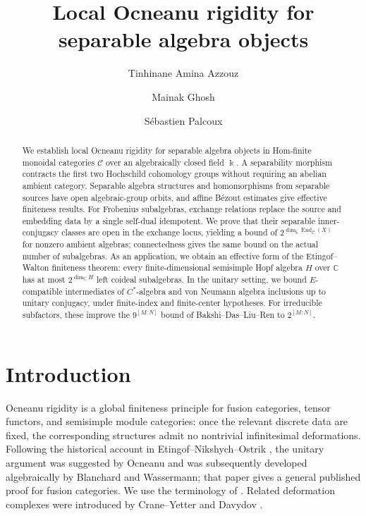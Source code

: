 \documentclass[11pt]{amsart}
\title[Local rigidity for separable algebra objects]
{Local Ocneanu rigidity for separable algebra objects}
\author{Tinhinane Amina Azzouz}
\author{Mainak Ghosh}
\author{S\'ebastien Palcoux}
\theoremstyle{definition}
\theoremstyle{remark}
\newcommand{\C}{\mathcal C}
\newcommand{\CC}{\mathbb C}
\newcommand{\kk}{\Bbbk}
\DeclareMathOperator{\End}{End}
\begin{document}
\begin{abstract}
We establish local Ocneanu rigidity for separable algebra objects in
Hom-finite monoidal categories $\C$ over an algebraically closed field $\kk$.
A separability morphism contracts the first two Hochschild cohomology
groups without requiring an abelian ambient category.  Separable algebra
structures and homomorphisms from separable sources have open algebraic-group
orbits, and affine B\'ezout estimates give effective finiteness results.
For Frobenius subalgebras, exchange relations replace the source and
embedding data by a single self-dual idempotent.  We prove that their
separable inner-conjugacy classes are open in the exchange locus,
yielding a bound of $2^{\dim_{\kk}\End_{\C}(X)}$ for nonzero ambient algebras;
connectedness gives the same bound on the actual number of subalgebras.
As an application, we obtain an effective form of the
Etingof--Walton finiteness theorem: every finite-dimensional semisimple
Hopf algebra $H$ over $\CC$ has at most $2^{\dim_{\CC}H}$ left coideal
subalgebras.  In the unitary setting, we bound $E$-compatible intermediates of
$C^*$-algebra and von Neumann algebra inclusions up to unitary conjugacy,
under finite-index and finite-center hypotheses.
For irreducible subfactors, these improve the
$9^{[M:N]}$ bound of Bakshi--Das--Liu--Ren to $2^{[M:N]}$.
\end{abstract}

\maketitle

\setcounter{tocdepth}{1}
\tableofcontents

\section{Introduction}

Ocneanu rigidity is a global finiteness principle for fusion categories,
tensor functors, and semisimple module categories: once the relevant discrete
data are fixed, the corresponding structures admit no nontrivial
infinitesimal deformations.  Following the historical account in Etingof--Nikshych--Ostrik
\cite{ENO}, the unitary argument was suggested by Ocneanu and was
subsequently developed algebraically by Blanchard and Wassermann;
that paper gives a general published proof for fusion categories.  We use
the terminology of \cite{EGNO}.  Related deformation complexes were
introduced by Crane--Yetter \cite{CraneYetter} and Davydov
\cite{Davydov}.
\end{document}
